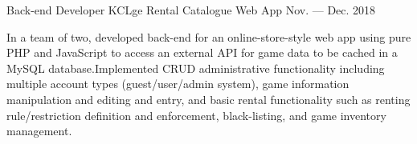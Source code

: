 \begin{cventries}
    \cventry
    {Back-end Developer} %
    {KCLge Rental Catalogue Web App} %
    {} %
    {Nov. --- Dec. 2018} %
    {
        \begin{cvitems}
            \bsep In a team of two, developed back-end for an online-store-style web app using pure PHP and JavaScript to access an external API for game data to be cached in a MySQL database.\bsep Implemented CRUD administrative functionality including multiple account types (guest/user/admin system), game information manipulation and editing and entry, and basic rental functionality such as renting rule/restriction definition and enforcement, black-listing, and game inventory management.
        \end{cvitems}
    }
\end{cventries}

